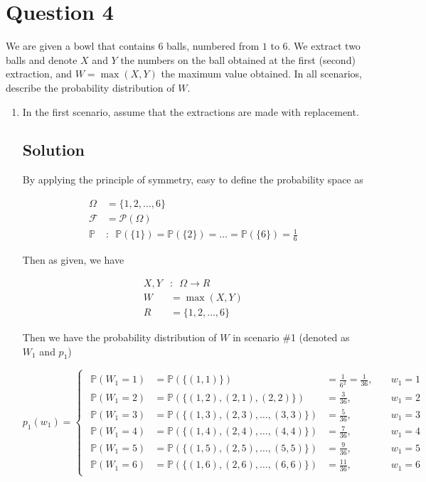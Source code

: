 \documentclass[12pt]{article}
\newcommand{\bP}{\mathbb{P}}
\begin{document}
	
	\section*{Question 4}
	
	\noindent We are given a bowl that contains $6$ balls, numbered from $1$ to $6$. We extract two balls and denote $X$ and $Y$ the numbers on the ball obtained at the first (second) extraction, and $W = \max(X,Y)$ the maximum value obtained. In all scenarios, describe the probability distribution of $W$.
	
	\bigskip
	
	\begin{enumerate}[start=1,label={\bfseries Part \arabic*:},leftmargin=0in]
		\bigskip\item In the first scenario, assume that the extractions are made with replacement.
		
		\subsection*{Solution}
		
			By applying the principle of symmetry, easy to define the probability space as
			
			\[
			\begin{aligned}
				\Omega &= \{1,2,\dots,6\}\\
				\mathcal{F} &= \mathcal{P}(\Omega)\\
				\bP &:\enspace \bP(\{1\}) = \bP(\{2\}) = \dots = \bP(\{6\}) = \frac{1}{6}
			\end{aligned}
			\]
			
			Then as given, we have
			
			\[
			\begin{aligned}
				X,Y &:\enspace \Omega \rightarrow R\\
				W &= \max(X,Y)\\
				R &= \{1,2,\dots,6\}
			\end{aligned}
			\]
			
			Then we have the probability distribution of $W$ in scenario \#1 (denoted as $W_1$ and $p_1$)
			
			\[
			p_1(w_1) =
			\begin{cases}
				\begin{aligned}
					\bP(W_1 = 1) &= \bP(\{(1,1)\}) &= \frac{1}{6^2} = \frac{1}{36},&\quad w_1 = 1\\
					\bP(W_1 = 2) &= \bP(\{(1,2),(2,1),(2,2)\}) &= \frac{3}{36},&\quad w_1 = 2\\
					\bP(W_1 = 3) &= \bP(\{(1,3),(2,3),\dots,(3,3)\}) &= \frac{5}{36},&\quad w_1 = 3\\
					\bP(W_1 = 4) &= \bP(\{(1,4),(2,4),\dots,(4,4)\}) &= \frac{7}{36},&\quad w_1 = 4\\
					\bP(W_1 = 5) &= \bP(\{(1,5),(2,5),\dots,(5,5)\}) &= \frac{9}{36},&\quad w_1 = 5\\
					\bP(W_1 = 6) &= \bP(\{(1,6),(2,6),\dots,(6,6)\}) &= \frac{11}{36},&\quad w_1 = 6
				\end{aligned}
			\end{cases}
			\]
			

\end{enumerate}
\end{document}
